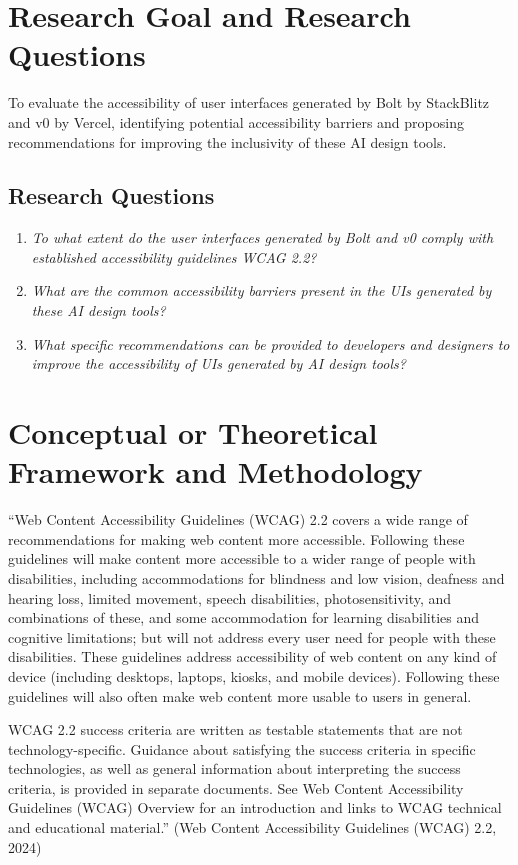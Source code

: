 \documentclass{article}
\begin{document}
\section{Research Goal and Research Questions}
To evaluate the accessibility of user interfaces generated by Bolt by StackBlitz and v0 by Vercel,
identifying potential accessibility barriers and proposing recommendations for improving the inclusivity of these AI design tools.

\subsection{Research Questions}

\begin{enumerate}
  \item \textit{To what extent do the user interfaces generated by Bolt and v0 comply with established accessibility guidelines WCAG 2.2?}
  \item \textit{What are the common accessibility barriers present in the UIs generated by these AI design tools?}
  \item \textit{What specific recommendations can be provided to developers and designers to improve the accessibility of UIs generated by AI design tools?}
\end{enumerate}

\section{Conceptual or Theoretical Framework and Methodology}
“Web Content Accessibility Guidelines (WCAG) 2.2 covers a wide range of recommendations for making web content more accessible.
Following these guidelines will make content more accessible to a wider range of people with disabilities,
including accommodations for blindness and low vision, deafness and hearing loss, limited movement, speech disabilities, photosensitivity,
and combinations of these, and some accommodation for learning disabilities and cognitive limitations;
but will not address every user need for people with these disabilities.
These guidelines address accessibility of web content on any kind of device (including desktops, laptops, kiosks, and mobile devices).
Following these guidelines will also often make web content more usable to users in general.

WCAG 2.2 success criteria are written as testable statements that are not technology-specific.
Guidance about satisfying the success criteria in specific technologies,
as well as general information about interpreting the success criteria, is provided in separate documents.
See Web Content Accessibility Guidelines (WCAG) Overview for an introduction and links to WCAG technical and educational material.”
(Web Content Accessibility Guidelines (WCAG) 2.2, 2024)
\end{document}
